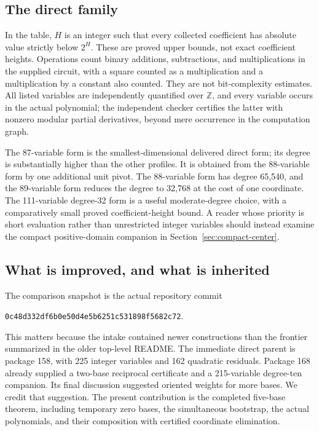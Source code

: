 \documentclass[11pt]{article}
\theoremstyle{definition}\newtheorem{definition}[theorem]{Definition}
\theoremstyle{remark}\newtheorem{remark}[theorem]{Remark}
\newcommand{\Z}{\mathbb Z}
\begin{document}
\subsection{The direct family}



In the table, $H$ is an integer such that every collected coefficient has
absolute value strictly below $2^H$. These are proved upper bounds, not
exact coefficient heights. Operations count binary additions, subtractions,
and multiplications in the supplied circuit, with a square counted as a
multiplication and a multiplication by a constant also counted. They are
not bit-complexity estimates. All listed variables are independently
quantified over $\Z$, and every variable occurs in the actual polynomial;
the independent checker certifies the latter with nonzero modular partial
derivatives, beyond mere occurrence in the computation graph.

The 87-variable form is the smallest-dimensional delivered direct form;
its degree is substantially higher than the other profiles. It is obtained
from the 88-variable form by one additional unit pivot. The 88-variable
form has degree 65,540, and the 89-variable form reduces the degree to
32,768 at the cost of one coordinate.
The 111-variable degree-32 form is a useful moderate-degree choice, with
a comparatively small proved coefficient-height bound. A reader whose
priority is short evaluation rather than unrestricted integer variables
should instead examine the compact positive-domain companion in
Section~\ref{sec:compact-center}.

\subsection{What is improved, and what is inherited}

The comparison snapshot is the actual repository commit
\begin{center}\small\texttt{0c48d332df6b0e50d4e5b6251c531898f5682c72}.\end{center}
This matters because the intake contained newer constructions than the
frontier summarized in the older top-level README. The immediate direct
parent is package 158, with 225 integer variables and 162 quadratic
residuals. Package 168 already supplied a two-base reciprocal certificate
and a 215-variable degree-ten companion. Its final discussion suggested
oriented weights for more bases. We credit that suggestion. The present
contribution is the completed five-base theorem, including temporary zero
bases, the simultaneous bootstrap, the actual polynomials, and their
composition with certified coordinate elimination.
\end{document}

